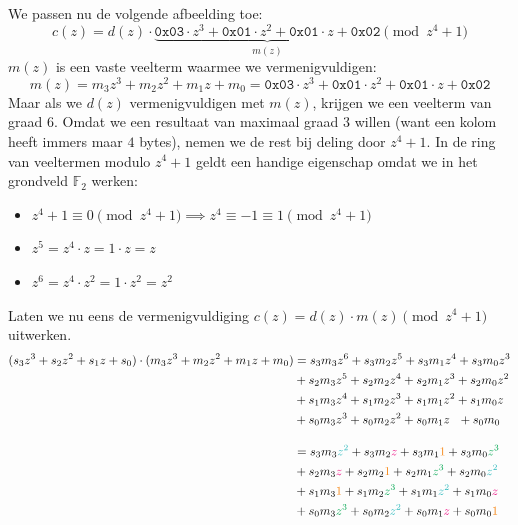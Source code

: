 We passen nu de volgende afbeelding toe:
\begin{equation*}
    c(z) = d(z) \cdot \underbrace{\mathtt{0x03} \cdot z^3 + \mathtt{0x01} \cdot z^2 + \mathtt{0x01} \cdot z + \mathtt{0x02}}_{m(z)} \pmod {z^4 + 1}
\end{equation*}
$m(z)$ is een vaste veelterm waarmee we vermenigvuldigen:
\begin{equation*}
    m(z) = m_3z^3 + m_2z^2 + m_1z + m_0 = \mathtt{0x03} \cdot z^3 + \mathtt{0x01} \cdot z^2 + \mathtt{0x01} \cdot z + \mathtt{0x02}
\end{equation*}
Maar als we $d(z)$ vermenigvuldigen met $m(z)$, krijgen we een veelterm van graad $6$. Omdat we een resultaat van maximaal graad $3$ willen (want een kolom heeft immers maar $4$ bytes), nemen we de rest bij deling door $z^4+1$. In de ring van veeltermen modulo $z^4+1$ geldt een handige eigenschap omdat we in het grondveld $\mathbb{F}_2$ werken:
\begin{itemize}
    \item $z^4+1 \equiv 0 \pmod {z^4+1} \implies z^4 \equiv -1 \equiv 1 \pmod {z^4+1}$
    \item $z^5 = z^4 \cdot z = 1 \cdot z = z$
    \item $z^6 = z^4 \cdot z^2 = 1 \cdot z^2 = z^2$
\end{itemize}
Laten we nu eens de vermenigvuldiging $c(z) = d(z) \cdot m(z) \pmod {z^4+1}$ uitwerken.
\begin{equation*}
    \begin{aligned}
        (s_3z^3 + s_2z^2 + s_1z + s_0) \cdot (m_3z^3 + m_2z^2 + m_1z + m_0) &= s_3m_3z^6 + s_3m_2z^5 + s_3m_1z^4 + s_3m_0z^3 \\
        &+ s_2m_3z^5 + s_2m_2z^4 + s_2m_1z^3 + s_2m_0z^2 \\
        &+ s_1m_3z^4 + s_1m_2z^3 + s_1m_1z^2 + s_1m_0z\\
        &+ s_0m_3z^3 + s_0m_2z^2 + s_0m_1z \ \ + s_0m_0
        \\[1em]
        &= s_3m_3\textcolor{Aquamarine}{z^2} + s_3m_2\textcolor{RubineRed}{z} + s_3m_1\textcolor{BurntOrange}{1} + s_3m_0\textcolor{Green}{z^3} \\
        &+ s_2m_3\textcolor{RubineRed}{z} + s_2m_2\textcolor{BurntOrange}{1} + s_2m_1\textcolor{Green}{z^3} + s_2m_0\textcolor{Aquamarine}{z^2} \\
        &+ s_1m_3\textcolor{BurntOrange}{1} + s_1m_2\textcolor{Green}{z^3} + s_1m_1\textcolor{Aquamarine}{z^2} + s_1m_0\textcolor{RubineRed}{z} \\
        &+ s_0m_3\textcolor{Green}{z^3} + s_0m_2\textcolor{Aquamarine}{z^2} + s_0m_1\textcolor{RubineRed}{z} + s_0m_0\textcolor{BurntOrange}{1}
    \end{aligned}
\end{equation*}
